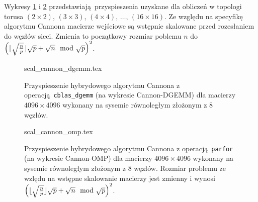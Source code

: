 \clearpage

Wykresy \ref{pl:scal_cannon_dgemm} i \ref{pl:scal_cannon_omp} przedstawiają przyspieszenia uzyskane dla obliczeń w topologi torusa \((2\times 2)\), \((3\times 3)\), \((4\times 4)\), \(\dots\), \((16\times 16)\). Ze względu na specyfikę algorytmu Cannona macierze wejściowe są wstępnie skalowane przed rozesłaniem do węzłów sieci. Zmienia to początkowy rozmiar poblemu \(n\) do \(\left( \lfloor \sqrt{\frac{n}{p}} \rfloor \sqrt{p} + \sqrt{n}\mod{\sqrt{p}}\right)^2\).

\begin{figure}[H]
\centering
\footnotesize
{scal_cannon_dgemm.tex}
\caption{Przyspieszenie hybrydowego algorytmu Cannona z operacją \texttt{cblas\_dgemm} (na wykresie Cannon-DGEMM) dla macierzy \(4096\times 4096\) wykonany na sysemie równoległym złożonym z 8 węzłów.}
\label{pl:scal_cannon_dgemm}
\end{figure}


\begin{figure}[H]
\centering
\footnotesize
{scal_cannon_omp.tex}
\caption{Przyspieszenie hybrydowego algorytmu Cannona z operacją \texttt{parfor} (na wykresie Cannon-OMP) dla macierzy \(4096\times 4096\) wykonany na sysemie równoległym złożonym z 8 węzłów. Rozmiar problemu ze wzlędu na wstępne skalowanie macierzy jest zmienny i wynosi \(\left( \lfloor \sqrt{\frac{n}{p}} \rfloor \sqrt{p} + \sqrt{n}\mod{\sqrt{p}}\right)^2\). }
\label{pl:scal_cannon_omp}
\end{figure}

